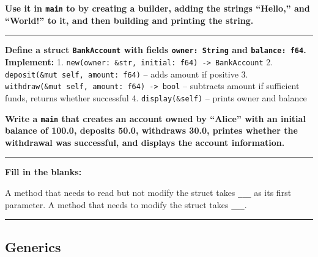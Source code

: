 \documentclass[
  11pt,
]{article}
\newenvironment{Shaded}{}{}
\begin{document}
\textbf{Use it in \texttt{main} to by creating a builder, adding the
strings ``Hello,'' and ``World!'' to it, and then building and printing
the string.}

\begin{Shaded}
\begin{Highlighting}[]

\end{Highlighting}
\end{Shaded}

\begin{center}\rule{0.5\linewidth}{0.5pt}\end{center}

\textbf{Define a struct \texttt{BankAccount} with fields
\texttt{owner:\ String} and \texttt{balance:\ f64}. Implement:} 1.
\texttt{new(owner:\ \&str,\ initial:\ f64)\ -\textgreater{}\ BankAccount}
2. \texttt{deposit(\&mut\ self,\ amount:\ f64)} -- adds amount if
positive 3.
\texttt{withdraw(\&mut\ self,\ amount:\ f64)\ -\textgreater{}\ bool} --
subtracts amount if sufficient funds, returns whether successful 4.
\texttt{display(\&self)} -- prints owner and balance

\textbf{Write a \texttt{main} that creates an account owned by ``Alice''
with an initial balance of 100.0, deposits 50.0, withdraws 30.0, printes
whether the withdrawal was successful, and displays the account
information.}

\begin{Shaded}
\begin{Highlighting}[]

\end{Highlighting}
\end{Shaded}

\begin{center}\rule{0.5\linewidth}{0.5pt}\end{center}

\textbf{Fill in the blanks:}

A method that needs to read but not modify the struct takes
\texttt{\_\_\_} as its first parameter. A method that needs to modify
the struct takes \texttt{\_\_\_}.

\begin{center}\rule{0.5\linewidth}{0.5pt}\end{center}

\subsection{Generics}\label{generics}
\end{document}
